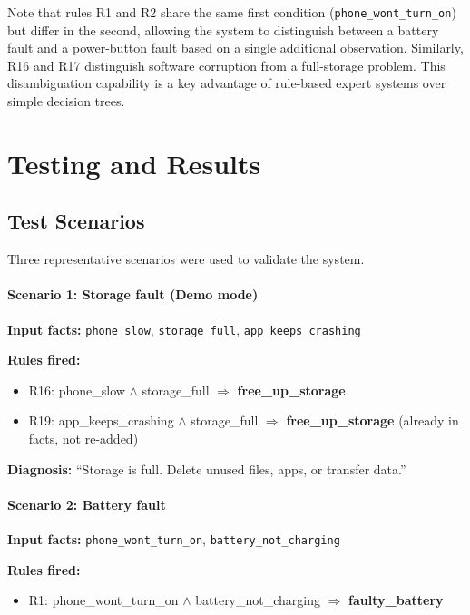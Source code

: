 \documentclass[12pt,a4paper]{article}
\begin{document}
Note that rules R1 and R2 share the same first condition
(\texttt{phone\_wont\_turn\_on}) but differ in the second, allowing the system to
distinguish between a battery fault and a power-button fault based on a single
additional observation. Similarly, R16 and R17 distinguish software corruption
from a full-storage problem. This disambiguation capability is a key advantage of
rule-based expert systems over simple decision trees.

\section{Testing and Results}

\subsection{Test Scenarios}

Three representative scenarios were used to validate the system.

\paragraph{Scenario 1: Storage fault (Demo mode)}

\textbf{Input facts:} \texttt{phone\_slow}, \texttt{storage\_full},
\texttt{app\_keeps\_crashing}

\textbf{Rules fired:}
\begin{itemize}[nosep]
    \item R16: phone\_slow $\wedge$ storage\_full $\Rightarrow$ \textbf{free\_up\_storage}
    \item R19: app\_keeps\_crashing $\wedge$ storage\_full $\Rightarrow$ \textbf{free\_up\_storage} (already in facts, not re-added)
\end{itemize}

\textbf{Diagnosis:} ``Storage is full. Delete unused files, apps, or transfer data.''

\paragraph{Scenario 2: Battery fault}

\textbf{Input facts:} \texttt{phone\_wont\_turn\_on}, \texttt{battery\_not\_charging}

\textbf{Rules fired:}
\begin{itemize}[nosep]
    \item R1: phone\_wont\_turn\_on $\wedge$ battery\_not\_charging $\Rightarrow$ \textbf{faulty\_battery}
\end{itemize}
\end{document}
